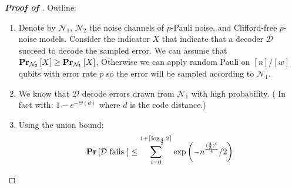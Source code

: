 \documentclass[manuscript,screen,review]{acmart}
\begin{document}
\begin{proof}[\textbf{Proof of }]

  Outline: 
  \begin{enumerate}
    \item Denote by $\mathcal{N}_{1}$, $\mathcal{N}_{2}$ the noise channels of $p$-Pauli noise, and Clifford-free $p$-noise models. Consider the indicator $X$ that indicate that a decoder $\mathcal{D}$ succeed to decode the sampled error. We can assume that $\prbm{X}{\mathcal{N}_{2}} \ge \prbm{X}{\mathcal{N}_{1}}$, Otherwise we can apply random Pauli on $[n]/[w]$ qubits with error rate $p$ so the error will be sampled according to $\mathcal{N}_1$.
    \item We know that $\mathcal{D}$ decode errors drawn from $\mathcal{N}_{1}$ with high probability. ( In fact with:  $1 - e^{-\Theta(d)}$ where $d$ is the code distance.)   
    \item Using the union bound: \begin{equation*}
        \begin{split}
          \prb{ \mathcal{D} \text{ fails } } \le \sum_{i=0}^{1 + \lceil \log_{\frac{4}{3}}{2} \rceil }{ \exp \left(  - n^\frac{(\frac{4}{3})^{i}}{4}/2 \right)  }
        \end{split}
      \end{equation*}
\end{enumerate}


\end{proof}




%
\cite{leverrier2022quantum}
\cite{moore1998parallel}
\cite{bravyi2012magic}
\cite{Tillich_2014}
\cite{meier2012magicstate}

\printbibliography
\end{document}
